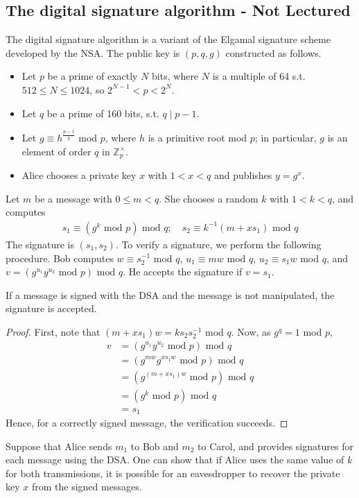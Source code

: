 \subsection{The digital signature algorithm - Not Lectured}
The digital signature algorithm is a variant of the Elgamal signature scheme developed by the NSA.
The public key is $(p, q, g)$ constructed as follows.
\begin{itemize}
    \item Let $p$ be a prime of exactly $N$ bits, where $N$ is a multiple of 64 s.t. $512 \leq N \leq 1024$, so $2^{N-1} < p < 2^N$.
    \item Let $q$ be a prime of 160 bits, s.t. $q \mid p-1$.
    \item Let $g \equiv h^{\frac{p-1}{q}}$ mod $p$, where $h$ is a primitive root mod $p$; in particular, $g$ is an element of order $q$ in $\mathbb Z_p^\times$.
    \item Alice chooses a private key $x$ with $1 < x < q$ and publishes $y = g^x$.
\end{itemize}
Let $m$ be a message with $0 \leq m < q$.
She chooses a random $k$ with $1 < k < q$, and computes
\begin{align*}
    s_1 \equiv (g^k \text{ mod } p) \text{ mod } q;\quad s_2 \equiv k^{-1}(m+xs_1) \text{ mod } q
\end{align*}
The signature is $(s_1, s_2)$.
To verify a signature, we perform the following procedure.
Bob computes $w \equiv s_2^{-1}$ mod $q$, $u_1 \equiv mw$ mod $q$, $u_2 \equiv s_1 w$ mod $q$, and $v = (g^{u_1} y^{u_2} \text{ mod } p) \text{ mod } q$.
He accepts the signature if $v = s_1$.
\begin{proposition}
    If a message is signed with the DSA and the message is not manipulated, the signature is accepted.
\end{proposition}
\begin{proof}
    First, note that $(m + xs_1)w = ks_2s_2^{-1}$ mod $q$.
    Now, as $g^q = 1$ mod $p$,
    \begin{align*}
        v &= (g^{u_1} y^{u_2} \text{ mod } p) \text{ mod } q \\
        &= (g^{mw} g^{xs_1 w} \text{ mod } p) \text{ mod } q \\
        &= (g^{(m + xs_1)w} \text{ mod } p) \text{ mod } q \\
        &= (g^k \text{ mod } p) \text{ mod } q \\
        &= s_1
    \end{align*}
    Hence, for a correctly signed message, the verification succeeds.
\end{proof}
Suppose that Alice sends $m_1$ to Bob and $m_2$ to Carol, and provides signatures for each message using the DSA.
One can show that if Alice uses the same value of $k$ for both transmissions, it is possible for an eavesdropper to recover the private key $x$ from the signed messages.

